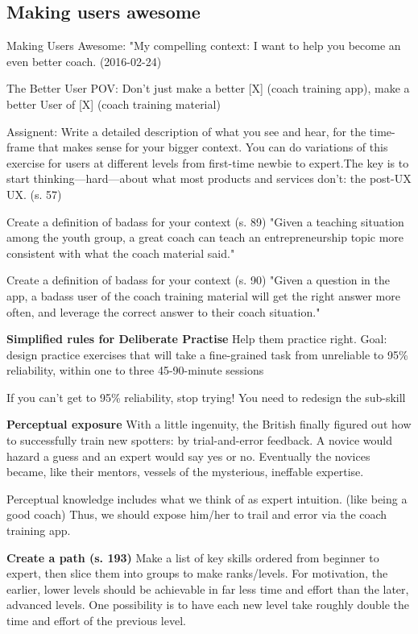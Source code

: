 \subsection{Making users awesome}

Making Users Awesome: "My compelling context: I want to help you become an even better coach. (2016-02-24)

The Better User POV:
Don’t just make a better [X] (coach training app),
make a better User of [X] (coach training material)

Assignent:
Write a detailed description of what you see and hear, for the time-frame that makes sense for your bigger context.
You can do variations of this exercise for users at different levels from first-time newbie to expert.The key is to start thinking—hard—about what most products and services don’t: the post-UX UX. (s. 57)

Create a definition of badass for your context (s. 89)
"Given a teaching situation among the youth group, a great coach can teach an entrepreneurship topic more consistent with what the coach material said."

Create a definition of badass for your context (s. 90)
"Given a question in the app, a badass user of the coach training material will get the right answer more often, and leverage the correct answer to their coach situation."

\textbf{Simplified rules for Deliberate Practise}
Help them practice right. Goal: design practice exercises that will take a fine-grained task from unreliable to 95\% reliability, within one to three 45-90-minute sessions

If you can’t get to 95\% reliability, stop trying! You need to redesign the sub-skill

\textbf{Perceptual exposure}
With a little ingenuity, the British finally figured out how to successfully train new spotters: by trial-and-error feedback. A novice would hazard a guess and an expert would say yes or no. Eventually the novices became, like their mentors, vessels of the mysterious, ineffable expertise.

Perceptual knowledge includes what we think of as expert intuition. (like being a good coach) Thus, we should expose him/her to trail and error via the coach training app.

\textbf{Create a path (s. 193)}
Make a list of key skills ordered from beginner to expert, then slice them into groups to make ranks/levels. For motivation, the earlier, lower levels should be achievable in far less time and effort than the later, advanced levels. One possibility is to have each new level take roughly double the time and effort of the previous level.

